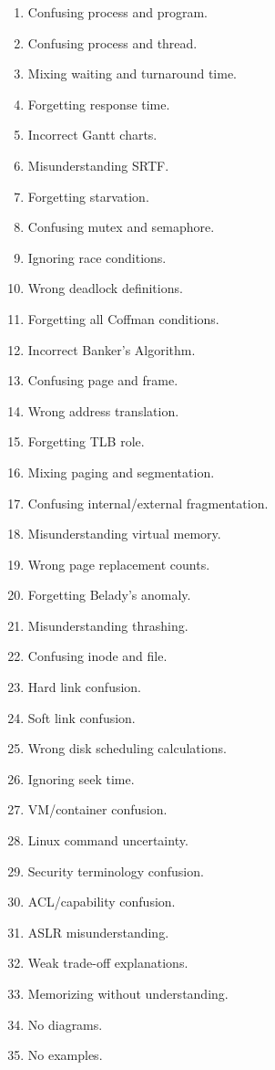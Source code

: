\begin{enumerate}
\item Confusing process and program.
\item Confusing process and thread.
\item Mixing waiting and turnaround time.
\item Forgetting response time.
\item Incorrect Gantt charts.
\item Misunderstanding SRTF.
\item Forgetting starvation.
\item Confusing mutex and semaphore.
\item Ignoring race conditions.
\item Wrong deadlock definitions.
\item Forgetting all Coffman conditions.
\item Incorrect Banker's Algorithm.
\item Confusing page and frame.
\item Wrong address translation.
\item Forgetting TLB role.
\item Mixing paging and segmentation.
\item Confusing internal/external fragmentation.
\item Misunderstanding virtual memory.
\item Wrong page replacement counts.
\item Forgetting Belady's anomaly.
\item Misunderstanding thrashing.
\item Confusing inode and file.
\item Hard link confusion.
\item Soft link confusion.
\item Wrong disk scheduling calculations.
\item Ignoring seek time.
\item VM/container confusion.
\item Linux command uncertainty.
\item Security terminology confusion.
\item ACL/capability confusion.
\item ASLR misunderstanding.
\item Weak trade-off explanations.
\item Memorizing without understanding.
\item No diagrams.
\item No examples.

\end{enumerate}
